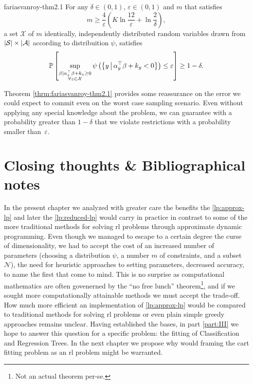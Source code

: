 \begin{thrm}{}{fariasvanroy-thm2.1}
    For any $\delta \in (0,1)$, $\varepsilon \in (0,1)$ and $m$ that satisfies
    \[
        m \geq \frac{4}{\varepsilon} \left( K \ln \frac{12}{\varepsilon} + \ln \frac{2}{\delta} \right),
    \]
    a set $\mathcal{X}$ of $m$ identically, independently distributed random
    variables drawn from $|\mathcal{S}| \times |\mathcal{A}|$ according to
    distribuition $\psi$, satisfies 
    \[
        \mathbb{P}\left[
            \sup_{\substack{\mathbf{\beta} \mid \alpha_{z}^{\top} \mathbf{\beta} + k_{z} \geq 0  \\ \forall z \in \mathcal{X} }}
            \psi \left( \left\{ y \,\middle\vert\, \alpha_{y}^{\top} \mathbf{\beta} + k_y  < 0 \right\} \right) \leq \varepsilon
        \right] \geq 1 - \delta.
    \]
\end{thrm}

Theorem \ref{thrm:fariasvanroy-thm2.1} provides some reassurance on the error we
could expect to commit even on the worst case sampling scenario. Even without
applying any special knowledge about the problem, we can guarantee with a
probability greater than $1 - \delta$ that we violate restrictions with a
probability smaller than~$\varepsilon$.

\section{Closing thoughts \& Bibliographical notes}

In the present chapter we analyzed with greater care the benefits the
\eqref{lp:approx-lp} and later the \eqref{lp:reduced-lp} would carry in practice
in contrast to some of the more traditional methods for solving \acf{rl}
problems through approximate dynamic programming. Even though we managed to
escape to a certain degree the curse of dimensionality, we had to accept the
cost of an increased number of parameters (choosing a distribution $\psi$, a
number $m$ of constraints, and a subset $\mathcal{N}$), the need for heuristic
approaches to setting parameters, decreased accuracy, to name the first that
come to mind. This is no surprise as computational mathematics are often
govenerned by the ``no free lunch'' theorem\footnote{Not an actual theorem
per-se.}, and if we sought more computationally attainable methods we must
accept the trade-off. How much more efficient an implementation of
\eqref{lp:approx-lp} would be compared to traditional methods for solving
\ac{rl} problems or even plain simple greedy approaches remains unclear.  Having
established the bases, in part \ref{part:III} we hope to answer this question
for a specific problem: the fitting of Classification and Regression Trees. In
the next chapter we propose why would framing the \ac{cart} fitting problem as
an \ac{rl} problem might be warranted.

